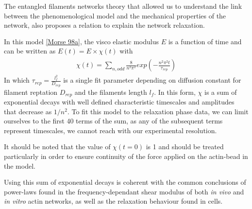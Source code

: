 \documentclass[A4paperpaper,11pt,english]{sphinxmanual}
\begin{document}
The entangled filaments networks theory that allowed us to understand the link between the phenomenological
model and the mechanical properties of the network, also proposes a relation to
explain the network relaxation.

In this model {\hyperref[index-latex:morse1998a]{{[}Morse 98a{]}}}, the visco elastic modulus  \(E\) is a function of time
and can be written as \(E(t) = E\times \chi(t)\) with
\label{index-latex:equation-chi}\begin{gather}
\begin{split}\chi(t)=\sum_{n, odd} \frac{8}{n^2 \pi^2}exp\left(- \frac{n^2\pi^2 t}{ \tau_{rep}} \right)\end{split}\label{index-latex-chi}
\end{gather}
In which \(\tau_{rep} = \frac{l_f^2}{D_{rep}}\) is a single fit parameter
depending on diffusion constant for filament reptation \(D_{rep}\) and the
filaments length \(l_f\). In this form, \(\chi\) is a sum of
exponential decays with well defined characteristic timescales and amplitudes
that decrease as \(1/n^2\). To fit this model to the
relaxation phase data, we can limit ourselves to the first 40 terms of the sum, as
any of the subsequent terms represent timescales, we cannot reach with our
experimental resolution.

It should be noted that the value of \(\chi(t=0)\) is 1 and should be
treated particularly in order to ensure continuity of the force applied on the
actin-bead in the model.

Using this sum of exponential decays is coherent with the common conclusions of
power-laws found in the frequency-dependant shear modulus of both \emph{in vivo} and \emph{in vitro} actin
networks, as well as the relaxation behaviour found in cells.
\end{document}
